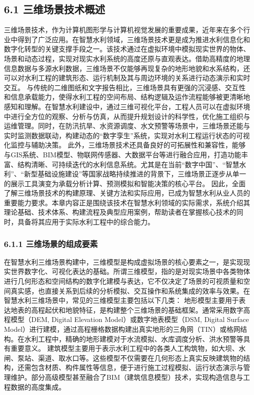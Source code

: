 \subsection{6.1 三维场景技术概述}\label{ux4e09ux7ef4ux573aux666fux6280ux672fux6982ux8ff0} 三维场景技术，作为计算机图形学与计算机视觉发展的重要成果，近年来在多个行业中得到了广泛应用。在智慧水利领域，三维场景技术更是成为推进水利信息化和数字化转型的关键支撑手段之一。该技术通过在虚拟环境中模拟现实世界的物体、场景和动态过程，实现对现实水利系统的高度还原与直观表达。借助高精度的地理信息数据与多源水利数据，三维场景不仅能够再现复杂的地形地貌和水系结构，还可以对水利工程的建筑形态、运行机制及其与周边环境的关系进行动态演示和实时交互。 与传统的二维图纸和文字报告相比，三维场景具有更强的沉浸感、交互性和信息承载能力，使得水利工程的空间布局、结构逻辑及运作流程能够被更清晰地感知和理解。在智慧水利建设中，通过三维可视化平台，工程人员可以在虚拟环境中进行全方位的观察、分析与仿真，从而提升规划设计的科学性，优化施工组织与运维管理。同时，在防汛抗旱、水资源调度、水文预警等场景中，三维场景还能与实时监测数据联动，构建动态的``数字孪生''系统，实现对水利工程运行状态的可视化监控与辅助决策。 此外，三维场景技术还具备良好的可拓展性和兼容性，能够与GIS系统、BIM模型、物联网传感器、大数据平台等进行融合应用，打造功能丰富、结构清晰、可持续迭代的水利信息系统。尤其是在当前``数字中国''、``智慧水利''、``新型基础设施建设''等国家战略持续推进的背景下，三维场景正逐步从单一的展示工具演变为承载分析计算、预测模拟和智能决策的核心平台。 因此，全面了解三维场景技术的构建原理、关键方法和实际应用，已成为智慧水利从业人员的重要能力要求。本章内容正是围绕该技术在智慧水利领域的实际需求，系统介绍其理论基础、技术体系、构建流程及典型应用案例，帮助读者在掌握核心技术的同时，具备将其应用于实际水利工程中的综合能力。 \subsubsection{6.1.1 三维场景的组成要素}\label{ux4e09ux7ef4ux573aux666fux7684ux7ec4ux6210ux8981ux7d20} 在智慧水利三维场景构建中，三维模型是构成虚拟场景的核心要素之一，是实现现实世界数字化、可视化表达的基础。所谓三维模型，指的是对现实场景中各类物体进行几何形态和空间结构的数字化建模与表达，它不仅决定了场景的可视质量和空间真实感，也直接关系到后续的分析模拟、交互操作和系统集成的效率与效果。在智慧水利三维场景中，常见的三维模型主要包括以下几类： 地形模型主要用于表达地表的高程起伏和地貌特征，是构建整个三维场景的基础框架。通常采用数字高程模型（DEM, Digital Elevation Model）或数字地表模型（DSM, Digital Surface Model）进行建模，通过高程栅格数据构建出真实地形的三角网（TIN）或格网结构。在水利工程中，精确的地形建模对于水流模拟、水库调度分析、洪水预警等具有重要意义。 建筑模型主要用于表示水利工程中的各类人工构筑物，如大坝、水闸、泵站、渠道、取水口等。这些模型不仅需要在几何形态上真实反映建筑物的结构，还需包含材质、构件属性等信息，便于进行施工过程模拟、运行状态演示与管理维护。部分高级模型甚至融合了BIM（建筑信息模型）技术，实现构造信息与工程数据的高度集成。 